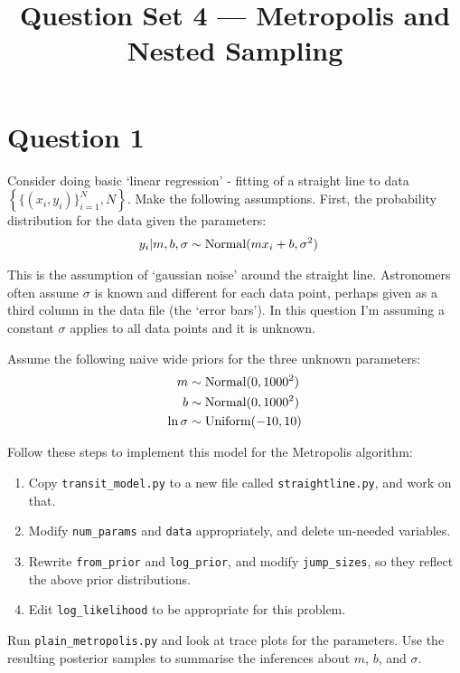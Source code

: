 \documentclass[a4paper, 12pt]{article}
\title{Question Set 4 --- Metropolis and Nested Sampling}
\author{}
\date{}
\begin{document}
\maketitle


\setlength{\parindent}{0pt}
\setlength{\parskip}{8pt}

\section*{Question 1}
Consider doing basic `linear regression' - fitting of a straight line to data
$\left\{\{(x_i, y_i)\}_{i=1}^N, N\right\}$.
Make the following assumptions. First, the probability distribution for the
data given the parameters:
\begin{align}
y_i | m, b, \sigma &\sim \textnormal{Normal}(mx_i + b, \sigma^2)
\end{align}

This is the assumption of `gaussian noise' around the straight line. Astronomers
often assume $\sigma$ is known and different for each data point, perhaps given
as a third column in the data file (the `error bars'). In this question I'm
assuming a constant $\sigma$ applies to all data points and it is unknown.

Assume the following naive wide priors for the three unknown parameters:
\begin{align}
m &\sim \textnormal{Normal}(0, 1000^2) \\
b &\sim \textnormal{Normal}(0, 1000^2) \\
\ln\sigma &\sim \textnormal{Uniform}(-10, 10)
\end{align}

Follow these steps to implement this model for the Metropolis algorithm:
\begin{enumerate}
\item Copy {\tt transit\_model.py} to a new file called {\tt straightline.py}, and
work on that.
\item Modify {\tt num\_params} and {\tt data} appropriately, and delete
un-needed variables.
\item Rewrite {\tt from\_prior} and {\tt log\_prior}, and modify
{\tt jump\_sizes}, so they reflect the above
prior distributions.
\item Edit {\tt log\_likelihood} to be appropriate for this problem.
\end{enumerate}

Run {\tt plain\_metropolis.py} and look at trace plots for the parameters.
Use the resulting posterior samples to summarise the inferences about
$m$, $b$, and $\sigma$.
\end{document}
